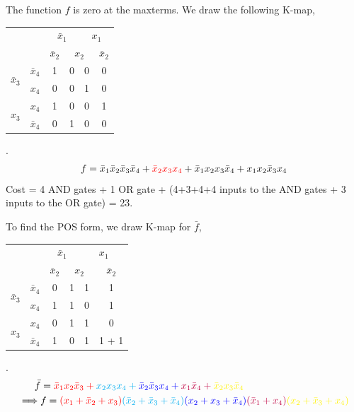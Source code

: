 \documentclass{article}
\newcommand{\bx}{\bar{x}}
\newcommand{\cred}{\color{red}}
\newcommand{\cb}{\color{blue}}
\begin{document}
The function $f$ is zero at the maxterms. We draw the following K-map,
\\
\begin{tabular}{c|c|c|c|c|c}
  \toprule
  && \multicolumn{2}{c|}{$\bx_1$} & \multicolumn{2}{c}{$x_1$}
  \\
  && $\bx_2$ & \multicolumn{2}{c|}{$x_2$} & $\bx_2$
  \\ \midrule
  \multirow{2}{*}{$\bx_3$} & $\bx_4$
                                  & 1 & 0 & 0 & 0
  \\
  & $x_4$
                                  & 0 & 0 & 1 & 0
  \\
  \multirow{2}{*}{$x_3$}   &  $x_4$
                                  & \cred 1 & 0 & 0 & \cred 1
  \\
  & $\bx_4$
                                  & 0 & 1 & 0 & 0
  \\\bottomrule
\end{tabular}.
\\
\begin{align}
  f = \bx_1 \bx_2 \bx_3 \bx_4 + {\cred \bx_2 x_3 x_4} + \bx_1 x_2  x_3 \bx_4 + x_1 x_2 \bx_3 x_4
\end{align}
Cost = 4 AND gates + 1 OR gate + (4+3+4+4 inputs to the AND gates + 3 inputs to the OR
gate) = 23.

To find the POS form, we draw K-map for $\bar{f}$,
\\
\begin{tabular}{c|c|c|c|c|c}
  \toprule
  && \multicolumn{2}{c|}{$\bx_1$} & \multicolumn{2}{c}{$x_1$}
  \\
  && $\bx_2$ & \multicolumn{2}{c|}{$x_2$} & $\bx_2$
  \\ \midrule
  \multirow{2}{*}{$\bx_3$} & $\bx_4$
                           & 0 & \cred 1 & \color{purple} 1 & \color{purple} 1
  \\
  & $x_4$
                                  & \cb 1 & \cred 1 & 0 & \cb 1
  \\
  \multirow{2}{*}{$x_3$}   &  $x_4$
                                  & 0 & \color{cyan} 1 & \color{cyan} 1 & 0
  \\
  & $\bx_4$
                                  & \color{yellow} 1 & 0 & \color{purple} 1 & \color{purple} 1 + \color{yellow} 1
  \\\bottomrule
\end{tabular}.
\\
\begin{align*}
  \bar{f} &= \cred \bx_1 x_2 \bx_3 + \color{cyan} x_2 x_3 x_4 
  + \cb \bx_2 \bx_3 x_4 + \color{purple} x_1 \bx_4 + \color{yellow} \bx_2 x_3 \bx_4
  \\
  \implies &f = {\cred (x_1 + \bx_2 + x_3)}{\color{cyan} (\bx_2 + \bx_3 + \bx_4)}
  {\cb (x_2 + x_3 + \bx_4)} {\color{purple} (\bx_1 + x_4)}{\color{yellow}(x_2 + \bx_3 + x_4)}
\end{align*}
\end{document}

